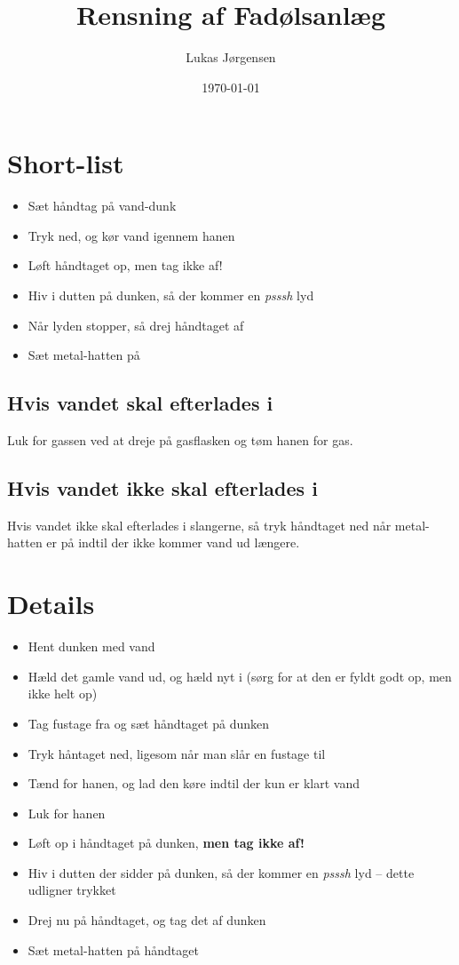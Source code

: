 

\title{Rensning af Fadølsanlæg}
\date{\today}
\author{Lukas Jørgensen}



\maketitle

\section{Short-list}

\begin{itemize}
  \item Sæt håndtag på vand-dunk
  \item Tryk ned, og kør vand igennem hanen
  \item Løft håndtaget op, men tag ikke af!
  \item Hiv i dutten på dunken, så der kommer en \textit{psssh} lyd
  \item Når lyden stopper, så drej håndtaget af
  \item Sæt metal-hatten på
\end{itemize}

\subsection{Hvis vandet skal efterlades i}
Luk for gassen ved at dreje på gasflasken og tøm hanen for gas.

\subsection{Hvis vandet ikke skal efterlades i}
Hvis vandet ikke skal efterlades i slangerne, så tryk håndtaget ned
når metal-hatten er på indtil der ikke kommer vand ud længere.

\section{Details}
\begin{itemize}
  \item Hent dunken med vand
  \item Hæld det gamle vand ud, og hæld nyt i (sørg for at den er
    fyldt godt op, men ikke helt op)
  \item Tag fustage fra og sæt håndtaget på dunken
  \item Tryk håntaget ned, ligesom når man slår en fustage til
  \item Tænd for hanen, og lad den køre indtil der kun er klart vand
  \item Luk for hanen
  \item Løft op i håndtaget på dunken, \textbf{men tag ikke af!}
  \item Hiv i dutten der sidder på dunken, så der kommer en
    \textit{psssh} lyd -- dette udligner trykket
  \item Drej nu på håndtaget, og tag det af dunken
  \item Sæt metal-hatten på håndtaget
\end{itemize}

